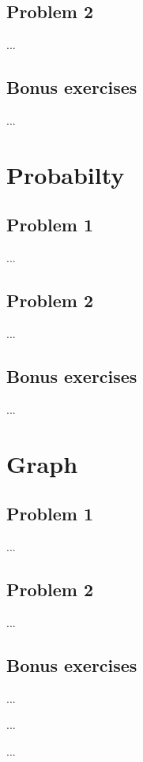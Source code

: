 \documentclass[a4paper]{article}
\begin{document}
	\subsection{Problem 2}
	...

	\subsection{Bonus exercises}
	...

\section{Probabilty}
	\subsection{Problem 1}
	...
	
	\subsection{Problem 2}
	...

	\subsection{Bonus exercises}
	...



\section{Graph}
	\subsection{Problem 1}
	...
	
	\subsection{Problem 2}
	...

	\subsection{Bonus exercises}
	...

\begin{thebibliography}{80}


...


...


\end{thebibliography}
\end{document}
